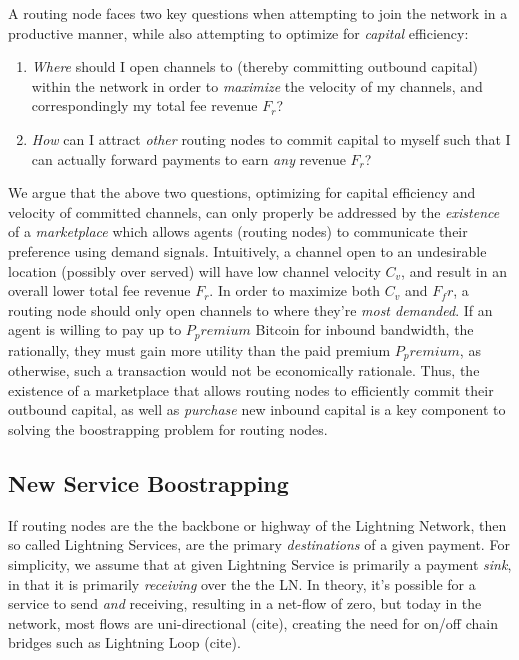 \documentclass[12pt,a4paper]{article}
\theoremstyle{definition}
\begin{document}
A routing node faces two key questions when attempting to join the network in a
productive manner, while also attempting to optimize for \emph{capital}
efficiency:

\begin{enumerate}
        \item \emph{Where} should I open channels to (thereby committing
            outbound capital) within the network in order to \emph{maximize}
            the velocity of my channels, and correspondingly my total fee
            revenue $F_r$?

        \item \emph{How} can I attract \emph{other} routing nodes to commit
            capital to myself such that I can actually forward payments to earn
            \emph{any} revenue $F_r$?
\end{enumerate}

We argue that the above two questions, optimizing for capital efficiency and
velocity of committed channels, can only properly be addressed by the
\emph{existence} of a \emph{marketplace} which allows agents (routing nodes) to
communicate their preference using demand signals. Intuitively, a channel open
to an undesirable location (possibly over served) will have low channel
velocity $C_{v}$, and result in an overall lower total fee revenue $F_r$. In
order to maximize both $C_v$ and $F_fr$, a routing node should only open
channels to where they're \emph{most demanded}. If an agent is willing to pay
up to $P_premium$ Bitcoin for inbound bandwidth, the rationally, they must gain
more utility than the paid premium $P_premium$, as otherwise, such a
transaction would not be economically rationale. Thus, the existence of a
marketplace that allows routing nodes to efficiently commit their outbound
capital, as well as \emph{purchase} new inbound capital is a key component to
solving the boostrapping problem for routing nodes.


\subsection{New Service Boostrapping}

If routing nodes are the the backbone or highway of the Lightning Network, then
so called Lightning Services, are the primary \emph{destinations} of a given
payment. For simplicity, we assume that at given Lightning Service is primarily
a payment \emph{sink}, in that it is primarily \emph{receiving} over the the
LN. In theory, it's possible for a service to send \emph{and} receiving,
resulting in a net-flow of zero, but today in the network, most flows are
uni-directional (cite), creating the need for on/off chain bridges such as
Lightning Loop (cite).
\end{document}
